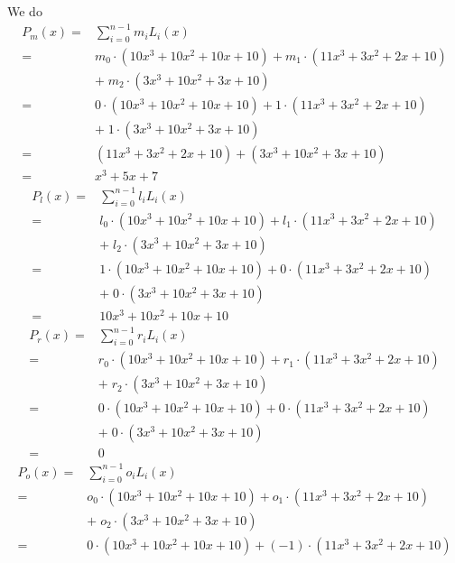 \begin{example}
We do
$$
\begin{array}{rl}
P_{m}(x) = & \sum_{i=0}^{n-1} {m_i}L_i(x)\\         
         = & m_0\cdot (10x^3 + 10 x^2 +10x + 10) + m_1\cdot (11x^3 +3x^2 +2x + 10) \\
           & +\; m_2\cdot (3x^3 +10x^2+ 3x + 10)\\
         = & 0\cdot (10x^3 + 10 x^2 +10x + 10) + 1\cdot (11x^3 +3x^2 +2x + 10) \\
           & +\; 1\cdot (3x^3 +10x^2+ 3x + 10)\\ 
         = & (11x^3 +3x^2 +2x + 10) + (3x^3 +10x^2+ 3x + 10)\\
         = & x^3  +5x + 7
\end{array}
$$
$$
\begin{array}{rl}
P_{l}(x) = & \sum_{i=0}^{n-1} {l_i}L_i(x)\\         
         = & l_0\cdot (10x^3 + 10 x^2 +10x + 10) + l_1\cdot (11x^3 +3x^2 +2x + 10) \\
           & +\; l_2\cdot (3x^3 +10x^2+ 3x + 10)\\
         = & 1\cdot (10x^3 + 10 x^2 +10x + 10) + 0\cdot (11x^3 +3x^2 +2x + 10) \\
           & +\; 0\cdot (3x^3 +10x^2+ 3x + 10)\\
         = & 10x^3 + 10 x^2 +10x + 10      
\end{array}
$$
$$
\begin{array}{rl}
P_{r}(x) = & \sum_{i=0}^{n-1} {r_i}L_i(x)\\         
         = & r_0\cdot (10x^3 + 10 x^2 +10x + 10) + r_1\cdot (11x^3 +3x^2 +2x + 10) \\
           & +\; r_2\cdot (3x^3 +10x^2+ 3x + 10)\\
         = & 0\cdot (10x^3 + 10 x^2 +10x + 10) + 0\cdot (11x^3 +3x^2 +2x + 10) \\
           & +\; 0\cdot (3x^3 +10x^2+ 3x + 10)\\
         = & 0          
\end{array}
$$
$$
\begin{array}{rl}
P_{o}(x) = & \sum_{i=0}^{n-1} {o_i}L_i(x)\\         
         = & o_0\cdot (10x^3 + 10 x^2 +10x + 10) + o_1\cdot (11x^3 +3x^2 +2x + 10) \\
           & +\; o_2\cdot (3x^3 +10x^2+ 3x + 10)\\
         = & 0\cdot (10x^3 + 10 x^2 +10x + 10) + (-1)\cdot (11x^3 +3x^2 +2x + 10) \\

\end{array}$$
\end{example}
